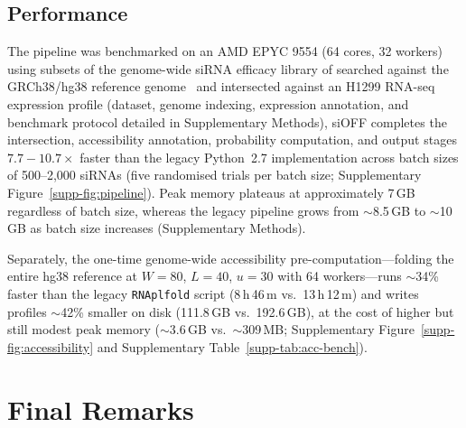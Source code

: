 \subsection*{Performance}
The pipeline was benchmarked on an AMD EPYC 9554 (64 cores, 32 workers) using subsets of the genome-wide siRNA efficacy library of \citet{huesken2005design} searched against the GRCh38/hg38 reference genome~\citep{schneider2017grch38} and intersected against an H1299 RNA-seq expression profile (dataset, genome indexing, expression annotation, and benchmark protocol detailed in Supplementary Methods), siOFF completes the intersection, accessibility annotation, probability computation, and output stages $7.7{-}10.7\times$ faster than the legacy Python~2.7 implementation across batch sizes of 500--2{,}000 siRNAs (five randomised trials per batch size; Supplementary Figure~\ref*{supp-fig:pipeline}).
Peak memory plateaus at approximately 7\,GB regardless of batch size, whereas the legacy pipeline grows from $\sim$8.5\,GB to $\sim$10\,GB as batch size increases (Supplementary Methods).

Separately, the one-time genome-wide accessibility pre-computation---folding the entire hg38 reference at $W{=}80$, $L{=}40$, $u{=}30$ with 64 workers---runs $\sim$34\% faster than the legacy \texttt{RNAplfold} script (8\,h\,46\,m vs.\ 13\,h\,12\,m) and writes profiles $\sim$42\% smaller on disk (111.8\,GB vs.\ 192.6\,GB), at the cost of higher but still modest peak memory ($\sim$3.6\,GB vs.\ $\sim$309\,MB; Supplementary Figure~\ref*{supp-fig:accessibility} and Supplementary Table~\ref*{supp-tab:acc-bench}).

\section{Final Remarks}


